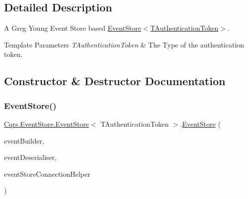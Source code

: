 \subsection{Detailed Description}
A Greg Young Event Store based \hyperlink{classCqrs_1_1EventStore_1_1EventStore_ab48ad2c9d72780ae3a662e213498f194_ab48ad2c9d72780ae3a662e213498f194}{Event\+Store$<$\+T\+Authentication\+Token$>$}. 


\begin{DoxyTemplParams}{Template Parameters}
{\em T\+Authentication\+Token} & The Type of the authentication token.\\
\hline
\end{DoxyTemplParams}


\subsection{Constructor \& Destructor Documentation}
\mbox{\label{classCqrs_1_1EventStore_1_1EventStore_ab48ad2c9d72780ae3a662e213498f194_ab48ad2c9d72780ae3a662e213498f194}} 
\subsubsection{\texorpdfstring{Event\+Store()}{EventStore()}}
{\footnotesize\ttfamily \hyperlink{classCqrs_1_1EventStore_1_1EventStore}{Cqrs.\+Event\+Store.\+Event\+Store}$<$ T\+Authentication\+Token $>$.\hyperlink{classCqrs_1_1EventStore_1_1EventStore}{Event\+Store} (\begin{DoxyParamCaption}\item[{\hyperlink{interfaceCqrs_1_1EventStore_1_1IEventBuilder}{I\+Event\+Builder}$<$ T\+Authentication\+Token $>$}]{event\+Builder,  }\item[{\hyperlink{interfaceCqrs_1_1EventStore_1_1IEventDeserialiser}{I\+Event\+Deserialiser}$<$ T\+Authentication\+Token $>$}]{event\+Deserialiser,  }\item[{\hyperlink{interfaceCqrs_1_1EventStore_1_1IEventStoreConnectionHelper}{I\+Event\+Store\+Connection\+Helper}}]{event\+Store\+Connection\+Helper }\end{DoxyParamCaption})}



